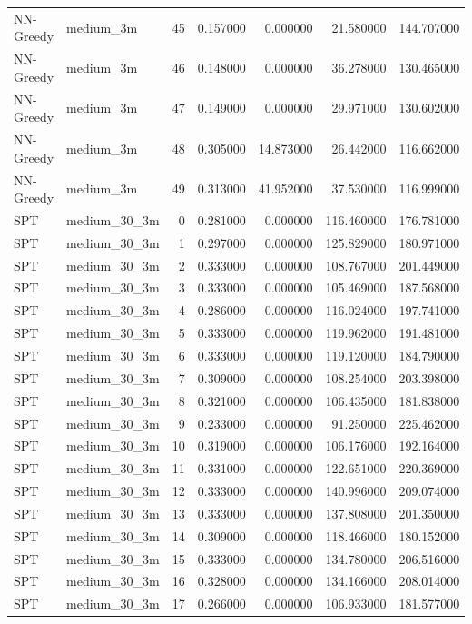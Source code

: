 \begin{tabular}{llrrrrr}
NN-Greedy & medium_3m & 45 & 0.157000 & 0.000000 & 21.580000 & 144.707000 \\
NN-Greedy & medium_3m & 46 & 0.148000 & 0.000000 & 36.278000 & 130.465000 \\
NN-Greedy & medium_3m & 47 & 0.149000 & 0.000000 & 29.971000 & 130.602000 \\
NN-Greedy & medium_3m & 48 & 0.305000 & 14.873000 & 26.442000 & 116.662000 \\
NN-Greedy & medium_3m & 49 & 0.313000 & 41.952000 & 37.530000 & 116.999000 \\
SPT & medium_30_3m & 0 & 0.281000 & 0.000000 & 116.460000 & 176.781000 \\
SPT & medium_30_3m & 1 & 0.297000 & 0.000000 & 125.829000 & 180.971000 \\
SPT & medium_30_3m & 2 & 0.333000 & 0.000000 & 108.767000 & 201.449000 \\
SPT & medium_30_3m & 3 & 0.333000 & 0.000000 & 105.469000 & 187.568000 \\
SPT & medium_30_3m & 4 & 0.286000 & 0.000000 & 116.024000 & 197.741000 \\
SPT & medium_30_3m & 5 & 0.333000 & 0.000000 & 119.962000 & 191.481000 \\
SPT & medium_30_3m & 6 & 0.333000 & 0.000000 & 119.120000 & 184.790000 \\
SPT & medium_30_3m & 7 & 0.309000 & 0.000000 & 108.254000 & 203.398000 \\
SPT & medium_30_3m & 8 & 0.321000 & 0.000000 & 106.435000 & 181.838000 \\
SPT & medium_30_3m & 9 & 0.233000 & 0.000000 & 91.250000 & 225.462000 \\
SPT & medium_30_3m & 10 & 0.319000 & 0.000000 & 106.176000 & 192.164000 \\
SPT & medium_30_3m & 11 & 0.331000 & 0.000000 & 122.651000 & 220.369000 \\
SPT & medium_30_3m & 12 & 0.333000 & 0.000000 & 140.996000 & 209.074000 \\
SPT & medium_30_3m & 13 & 0.333000 & 0.000000 & 137.808000 & 201.350000 \\
SPT & medium_30_3m & 14 & 0.309000 & 0.000000 & 118.466000 & 180.152000 \\
SPT & medium_30_3m & 15 & 0.333000 & 0.000000 & 134.780000 & 206.516000 \\
SPT & medium_30_3m & 16 & 0.328000 & 0.000000 & 134.166000 & 208.014000 \\
SPT & medium_30_3m & 17 & 0.266000 & 0.000000 & 106.933000 & 181.577000 \\

\end{tabular}
